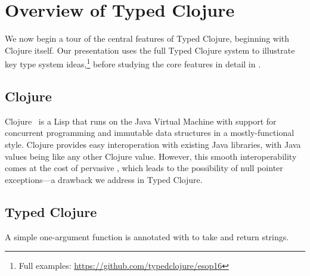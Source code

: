 \section{Overview of Typed Clojure}

\label{sec:overview}

We now begin a tour of the central features of Typed Clojure,
beginning with Clojure itself. Our presentation
uses the full Typed Clojure system to illustrate key type system
ideas,\footnote{Full examples: \url{https://github.com/typedclojure/esop16}} before studying the core features in detail in
.

\subsection{Clojure}

Clojure~\cite{Hic08} is a Lisp that runs on the
Java Virtual Machine with support for concurrent programming
and immutable data structures in a mostly-functional
style.
%
Clojure provides easy interoperation with existing Java libraries, with Java values being like any other Clojure value. 
However, this smooth interoperability comes at the cost of pervasive , which leads to the possibility of null pointer exceptions---a drawback we address in Typed Clojure.

%
%
%

\subsection{Typed Clojure}

A simple one-argument function  is annotated with  to take and return strings.

